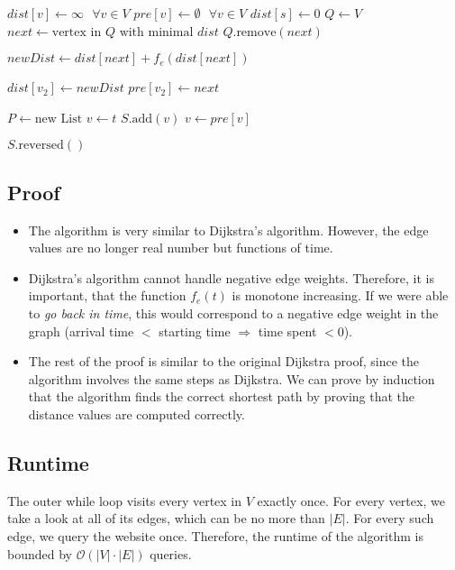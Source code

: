 \documentclass[12pt]{article}
\begin{document}
\begin{algorithmic}
	\State $\mathit{dist}[v] \gets \infty \mbox{    } \forall v \in V$
	\State $\mathit{pre}[v] \gets \emptyset \mbox{   } \forall v \in V$
	\State $\mathit{dist}[s] \gets 0$
	\State $Q \gets V$
		\State $\mathit{next} \gets \mbox{vertex in $Q$ with minimal $\mathit{dist}$}$
	\State $Q.\mbox{remove}(\mathit{next})$
	
		\State $\mathit{newDist} \gets \mathit{dist}[\mathit{next}] + f_e(\mathit{dist}[\mathit{next}])$
	
			\State $\mathit{dist}[v_2] \gets \mathit{newDist}$
			\State $\mathit{pre}[v_2] \gets \mathit{next}$
		\EndIf
	\EndFor
	\EndWhile

	\State $P \gets \mbox{new List}$
	\State $v \gets t$
		\State $S.\mbox{add}(v)$
		\State $v \gets \mathit{pre}[v]$	
	\EndWhile

	\Return $S.\mbox{reversed}()$
\end{algorithmic}

\subsection*{Proof}
\begin{itemize}
	\item The algorithm is very similar to Dijkstra's algorithm. However, the edge values are no longer real number but functions of time.
	\item Dijkstra's algorithm cannot handle negative edge weights. Therefore, it is important, that the function $f_e(t)$ is monotone increasing. If we were able to \emph{go back in time}, this would correspond to a negative edge weight in the graph (arrival time $<$ starting time $\Rightarrow$ time spent $< 0$).
	\item The rest of the proof is similar to the original Dijkstra proof, since the algorithm involves the same steps as Dijkstra. We can prove by induction that the algorithm finds the correct shortest path by proving that the distance values are computed correctly.
\end{itemize}

\subsection*{Runtime}
The outer while loop visits every vertex in $V$ exactly once. For every vertex, we take a look at all of its edges, which can be no more than $|E|$. For every such edge, we query the website once. Therefore, the runtime of the algorithm is bounded by $\mathcal{O}(|V| \cdot |E|)$ queries. 
\end{document}

